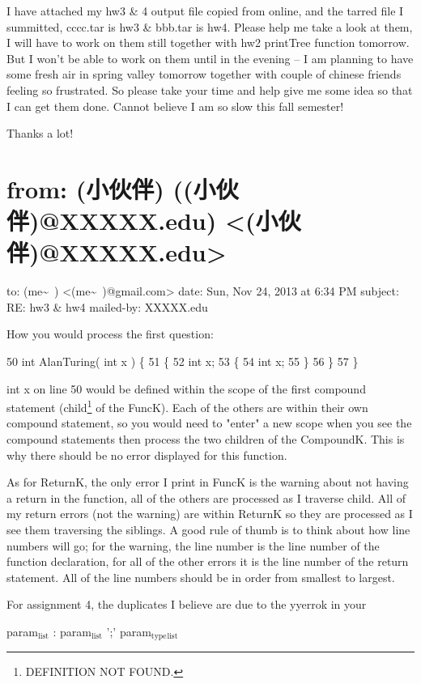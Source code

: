 \documentclass[12pt]{book}
\begin{document}
I have attached my hw3 \& 4 output file copied from online, and the tarred file I summitted, cccc.tar is hw3 \& bbb.tar is hw4. Please help me take a look at them, I will have to work on them still together with hw2 printTree function tomorrow. But I won't be able to work on them until in the evening -- I am planning to have some fresh air in spring valley tomorrow together with couple of chinese friends feeling so frustrated. So please take your time and help give me some idea so that I can get them done. Cannot believe I am so slow this fall semester!

Thanks a lot!


\section{from:         (小伙伴) ((小伙伴)@XXXXX.edu) <(小伙伴)@XXXXX.edu>}
\label{sec-1-2}
to:         (me\textasciitilde{}~) <(me\textasciitilde{}~)@gmail.com>
date:         Sun, Nov 24, 2013 at 6:34 PM
subject:         RE: hw3 \& hw4
mailed-by:         XXXXX.edu

How you would process the first question:

50 int AlanTuring( int x ) \{
51     \{
52         int x;
53         \{
54              int x;
55         \}
56     \}
57 \}

int x on line 50 would be defined within the scope of the first compound statement (child\footnote{DEFINITION NOT FOUND.} of the FuncK). Each of the others are within their own compound statement, so you would need to "enter" a new scope when you see the compound statements then process the two children of the CompoundK. This is why there should be no error displayed for this function. 

As for ReturnK, the only error I print in FuncK is the warning about not having a return in the function, all of the others are processed as I traverse child\footnotemark[1]{}. All of my return errors (not the warning) are within ReturnK so they are processed as I see them traversing the siblings. A good rule of thumb is to think about how line numbers will go; for the warning, the line number is the line number of the function declaration, for all of the other errors it is the line number of the return statement. All of the line numbers should be in order from smallest to largest.

For assignment 4, the duplicates I believe are due to the yyerrok in your 

param$_{\text{list}}$ : param$_{\text{list}}$ ';' param$_{\text{type}}$$_{\text{list}}$ 
\end{document}
